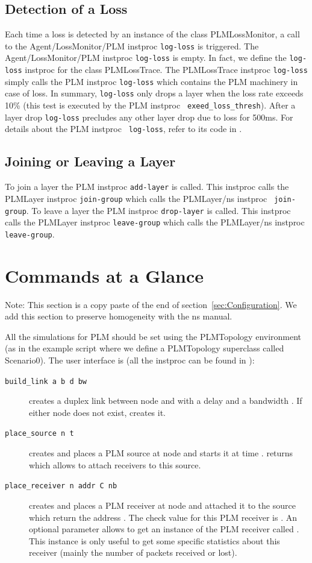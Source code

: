 {\subsection{Detection of a Loss}
Each time a loss is detected by an instance of the class PLMLossMonitor, a call to
the Agent/LossMonitor/PLM instproc {\tt log-loss} is triggered. The
Agent/LossMonitor/PLM instproc {\tt log-loss} 
is empty. In fact, we define the {\tt log-loss} instproc for the class
PLMLossTrace. The PLMLossTrace instproc {\tt log-loss} simply
calls the PLM instproc {\tt log-loss} which contains the PLM machinery in case
of loss. In summary, {\tt log-loss} only drops a layer when the loss rate
exceeds 10\% (this test is executed by the PLM instproc {\tt
  exeed\_loss\_thresh}). After a layer drop {\tt log-loss} precludes any
other layer drop due to loss for 500ms. For details about the PLM instproc {\tt
  log-loss}, refer to its code in . 

\subsection{Joining or Leaving a Layer}
To join a layer the PLM instproc {\tt add-layer} is called. This instproc
calls the PLMLayer instproc {\tt join-group} which calls the PLMLayer/ns instproc {\tt
  join-group}.
To leave a layer the PLM instproc {\tt drop-layer} is called. This instproc
calls the PLMLayer instproc {\tt leave-group} which calls the PLMLayer/ns instproc {\tt
  leave-group}.

\section{Commands at a Glance}
Note: This section is a copy paste of the end of
section~\ref{sec:Configuration}. We add this section to preserve homogeneity with
the ns manual.

All the simulations for PLM should be set using the PLMTopology environment (as
in the example script where we define a PLMTopology superclass called Scenario0). The
user interface is (all the instproc can be found in ):
\begin{description}
\item[\tt build\_link a b d bw] creates a duplex link between node
   and  with a delay  and a bandwidth . If
  either node does not exist,  creates it.
\item[\tt place\_source n t] creates and places a PLM source at node  and
  starts it at time .  returns  which
  allows to attach receivers to this source.
\item[\tt place\_receiver n addr C nb] creates and places a PLM receiver at node
   and attached it to the source which return the address . The
  check value for this PLM receiver is . An optional parameter 
  allows to get an instance of the PLM receiver called . This
  instance is only useful to get some specific statistics about this receiver
  (mainly the number of packets received or lost). %
\end{description}
}


